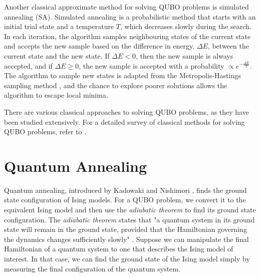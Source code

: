 Another classical approximate method for solving QUBO problems is simulated annealing (SA). Simulated annealing \cite{Kirkpatrick} is a probabilistic method that starts with an initial trial state and a temperature $T$, which decreases slowly during the search. In each iteration, the algorithm samples neighbouring states of the current state and accepts the new sample based on the difference in energy, $\Delta E$, between the current state and the new state. If $\Delta E < 0$, then the new sample is always accepted, and if $\Delta E \geq 0$, the new sample is accepted with a probability $\propto e^{-\frac{\Delta E}{T}}$. The algorithm to sample new states is adapted from the Metropolis-Hastings sampling method \cite{metropolissampling}, and the chance to explore poorer solutions allows the algorithm to escape local minima.

There are various classical approaches to solving QUBO problems, as they have been studied extensively. For a detailed survey of classical methods for solving QUBO problems, refer to \cite{punnen2022quadratic}.

\section{Quantum Annealing}\label{section:annealing}
Quantum annealing, introduced by Kadowaki and Nishimori , finds the ground state configuration of Ising models. For a QUBO problem, we convert it to the equivalent Ising model and then use the \textit{adiabatic theorem} to find its ground state configuration. The \textit{adiabatic theorem} states that "a quantum system in its ground state will remain in the ground state, provided that the Hamiltonian governing the dynamics changes sufficiently slowly" \cite{b14,b15}. Suppose we can manipulate the final Hamiltonian of a quantum system to one that describes the Ising model of interest. In that case, we can find the ground state of the Ising model simply by measuring the final configuration of the quantum system.

